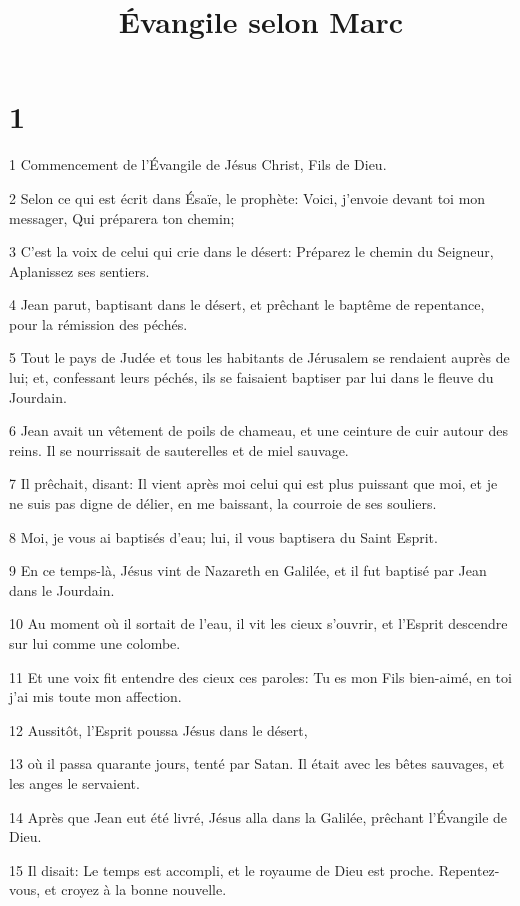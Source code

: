 

\title{Évangile selon Marc}


\chapter{1}

\par 1 Commencement de l'Évangile de Jésus Christ, Fils de Dieu.
\par 2 Selon ce qui est écrit dans Ésaïe, le prophète: Voici, j'envoie devant toi mon messager, Qui préparera ton chemin;
\par 3 C'est la voix de celui qui crie dans le désert: Préparez le chemin du Seigneur, Aplanissez ses sentiers.
\par 4 Jean parut, baptisant dans le désert, et prêchant le baptême de repentance, pour la rémission des péchés.
\par 5 Tout le pays de Judée et tous les habitants de Jérusalem se rendaient auprès de lui; et, confessant leurs péchés, ils se faisaient baptiser par lui dans le fleuve du Jourdain.
\par 6 Jean avait un vêtement de poils de chameau, et une ceinture de cuir autour des reins. Il se nourrissait de sauterelles et de miel sauvage.
\par 7 Il prêchait, disant: Il vient après moi celui qui est plus puissant que moi, et je ne suis pas digne de délier, en me baissant, la courroie de ses souliers.
\par 8 Moi, je vous ai baptisés d'eau; lui, il vous baptisera du Saint Esprit.
\par 9 En ce temps-là, Jésus vint de Nazareth en Galilée, et il fut baptisé par Jean dans le Jourdain.
\par 10 Au moment où il sortait de l'eau, il vit les cieux s'ouvrir, et l'Esprit descendre sur lui comme une colombe.
\par 11 Et une voix fit entendre des cieux ces paroles: Tu es mon Fils bien-aimé, en toi j'ai mis toute mon affection.
\par 12 Aussitôt, l'Esprit poussa Jésus dans le désert,
\par 13 où il passa quarante jours, tenté par Satan. Il était avec les bêtes sauvages, et les anges le servaient.
\par 14 Après que Jean eut été livré, Jésus alla dans la Galilée, prêchant l'Évangile de Dieu.
\par 15 Il disait: Le temps est accompli, et le royaume de Dieu est proche. Repentez-vous, et croyez à la bonne nouvelle.
